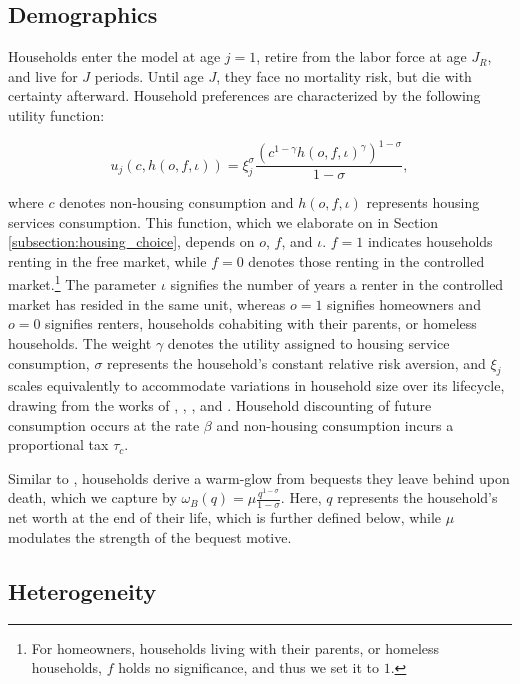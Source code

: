 \documentclass[parskip=full]{article}
\begin{document}
\subsection{Demographics}\label{subsection:demographics}

Households enter the model at age $j=1$, retire from the labor force at age $J_{R}$, and live for $J$ periods. Until age $J$, they face no mortality risk, but die with certainty afterward. Household preferences are characterized by the following utility function:

\begin{equation*}
    u_{j}(c,h(o,f,\iota))=\xi_{j}^{\sigma}\frac{\left(c^{1-\gamma} h(o,f,\iota)^{\gamma}\right)^{1-\sigma}}{1-\sigma},
\end{equation*}

\noindent where $c$ denotes non-housing consumption and $h(o,f,\iota)$ represents housing services consumption. This function, which we elaborate on in Section \ref{subsection:housing_choice}, depends on $o$, $f$, and $\iota$. $f=1$ indicates households renting in the free market, while $f=0$ denotes those renting in the controlled market.\footnote{For homeowners, households living with their parents, or homeless households, $f$ holds no significance, and thus we set it to $1$.} The parameter $\iota$ signifies the number of years a renter in the controlled market has resided in the same unit, whereas $o=1$ signifies homeowners and $o=0$ signifies renters, households cohabiting with their parents, or homeless households. The weight $\gamma$ denotes the utility assigned to housing service consumption, $\sigma$ represents the household's constant relative risk aversion, and $\xi_{j}$ scales equivalently to accommodate variations in household size over its lifecycle, drawing from the works of \citet{lm-1980}, \citet{wz-2010}, \citet{xu-2013}, and \citet{rs-2023}. Household discounting of future consumption occurs at the rate $\beta$ and non-housing consumption incurs a proportional tax $\tau_{c}$.

Similar to \citet{cagetti-denardi-2006}, households derive a warm-glow from bequests they leave behind upon death, which we capture by $\omega_{B}(q)=\mu \frac{q^{1-\sigma}}{1-\sigma}$. Here, $q$ represents the household's net worth at the end of their life, which is further defined below, while $\mu$ modulates the strength of the bequest motive.

\subsection{Heterogeneity}
\end{document}
